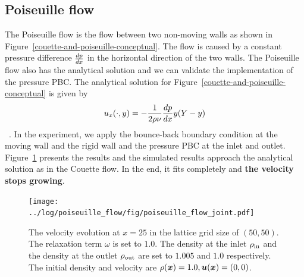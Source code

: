 \subsection{Poiseuille flow}
The Poiseuille flow is the flow between two non-moving walls as shown in Figure~\ref{couette-and-poiseuille-conceptual}.
The flow is caused by a constant pressure difference $\frac{d p}{d x}$
in the horizontal direction of the two walls.
The Poiseuille flow also has the analytical solution
and we can validate the implementation of the pressure PBC.
The analytical solution for Figure~\ref{couette-and-poiseuille-conceptual} is given by
\begin{equation}
\begin{aligned}
  u_x(\cdot, y) = - \frac{1}{2\rho \nu} \frac{d p}{d x} y (Y - y)
\end{aligned}
\end{equation}
~\cite{mendiburu2009analytical}.
In the experiment, we apply the bounce-back boundary condition
at the moving wall and the rigid wall
and the pressure PBC at the inlet and outlet.
Figure~\ref{fig:poiseuille-velocity-evolution} presents the results
and the simulated results approach the analytical solution as in the Couette flow.
In the end, it fits completely
and {\bf the velocity stops growing}.

\begin{figure}[H]
  \centering
  \texttt{[image: ../log/poiseuille\_flow/fig/poiseuille\_flow\_joint.pdf]}
  \vspace{-3mm}
  \caption{The velocity evolution at
  $x = 25$ in the lattice grid size of $(50, 50)$.
  The relaxation term $\omega$ is set to $1.0$.
  The density at the inlet $\rho_{\rm in}$ and the density
  at the outlet $\rho_{\rm out}$ are set to $1.005$ and $1.0$ respectively.
  The initial density and velocity are $\rho(\boldsymbol{x}) = 1.0, \boldsymbol{u}(\boldsymbol{x}) = (0, 0)$.
  \label{fig:poiseuille-velocity-evolution}}
\end{figure}

